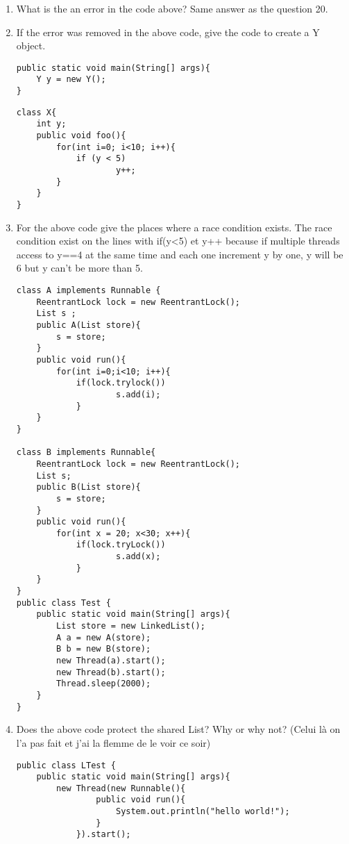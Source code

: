 \documentclass{article}
\begin{document}
\begin{enumerate}
	\item What is the an error in the code above?\newline
	Same answer as the question 20.
	\item If the error was removed in the above code, give the  code to create a Y object.
\begin{lstlisting}
public static void main(String[] args){
	Y y = new Y();
}
\end{lstlisting}
	\newpage
\begin{lstlisting}
class X{
 	int y;
 	public void foo(){
  		for(int i=0; i<10; i++){
   			if (y < 5)
    				y++;
 		}
 	}
}
\end{lstlisting}
	\item For the above code give the places where a race condition exists.\newline
	The race condition exist on the lines with if(y\textless 5) et y++ because if multiple threads access to y==4 at the same time and each one increment y by one, y will be 6 but y can't be more than 5.
\begin{lstlisting}
class A implements Runnable {
 	ReentrantLock lock = new ReentrantLock();
 	List s ;
 	public A(List store){
 		s = store;
 	}
 	public void run(){
 		for(int i=0;i<10; i++){
   			if(lock.trylock())
    				s.add(i);
    		}
 	}
}

class B implements Runnable{
 	ReentrantLock lock = new ReentrantLock();
 	List s;
 	public B(List store){
 		s = store;
 	}
 	public void run(){
  		for(int x = 20; x<30; x++){
   			if(lock.tryLock())
    				s.add(x);
    		}
 	}
}
public class Test {
 	public static void main(String[] args){
  		List store = new LinkedList();
  		A a = new A(store);
  		B b = new B(store);
  		new Thread(a).start();
  		new Thread(b).start();
  		Thread.sleep(2000);
 	}
}
\end{lstlisting}
	\item Does the above code protect the shared List? Why or why not?\newline
	(Celui là on l'a pas fait et j'ai la flemme de le voir ce soir)
	\newpage
\begin{lstlisting}
public class LTest {
 	public static void main(String[] args){
  		new Thread(new Runnable(){
     			public void run(){
      				System.out.println("hello world!");
     			}
     		}).start();
 

\end{lstlisting}
\end{enumerate}
\end{document}
